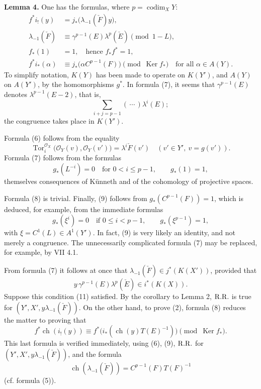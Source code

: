 \documentclass[11pt]{article}
\newcommand{\ch}{\operatorname{ch}}
\newcommand{\Tor}{\operatorname{Tor}}
\providecommand{\codim}{\operatorname{codim}}
\providecommand{\ch}{\operatorname{ch}}
\providecommand{\Tor}{\operatorname{Tor}}
\providecommand{\Ker}{\operatorname{Ker}}
\providecommand{\codim}{\operatorname{codim}}
\begin{document}
\textbf{Lemma 4.} One has the formulas, where \(p=\codim_XY\):
\begin{align}
  f^*i_!(y)&=j_*\bigl(\lambda_{-1}(\check F)y\bigr), \tag{6}\\
  \lambda_{-1}(\check F)&\equiv \gamma^{p-1}(E)\lambda^p(\check E)
    \pmod{1-L}, \tag{7}\\
  f_*(1)&=1,\quad\text{hence }f_*f^*=1, \tag{8}\\
  f^*i_*(\alpha)&\equiv j_*\bigl(\alpha C^{p-1}(F)\bigr)
    \pmod{\Ker f_*}\quad\text{for all }\alpha\in A(Y). \tag{9}
\end{align}
To simplify notation, \(K(Y)\) has been made to operate on \(K(Y')\), and \(A(Y)\) on \(A(Y')\), by the homomorphisms \(g^*\). In formula (7), it seems that \(\gamma^{p-1}(E)\) denotes \(\lambda^{p-1}(E-2)\), that is,
\[
  \sum_{i+j=p-1}(\,\cdots\,)\lambda^i(E);
\]
the congruence takes place in \(K(Y')\).

Formula (6) follows from the equality
\begin{equation}\tag{6 bis}
  \Tor_i^{\mathcal O_X}\bigl(\mathcal O_Y(v),\mathcal O_Y(v')\bigr)
  =
  \lambda^i\check F(v')
  \quad (v'\in Y',\ v=g(v')).
\end{equation}
Formula (7) follows from the formulas
\begin{equation}\tag{10}
  g_*(L^{-i})=0\quad\text{for }0<i\leq p-1,\qquad g_*(1)=1,
\end{equation}
themselves consequences of Künneth and of the cohomology of projective spaces.

Formula (8) is trivial. Finally, (9) follows from \(g_*(C^{p-1}(F))=1\), which is deduced, for example, from the immediate formulas
\begin{equation}\tag{10 bis}
  g_*(\xi^i)=0\quad\text{if }0\leq i<p-1,\qquad
  g_*(\xi^{p-1})=1,
\end{equation}
with \(\xi=C^1(L)\in A^1(Y')\). In fact, (9) is very likely an identity, and not merely a congruence. The unnecessarily complicated formula (7) may be replaced, for example, by VII 4.1.

From formula (7) it follows at once that \(\lambda_{-1}(\check F)\in j^*(K(X'))\), provided that
\begin{equation}\tag{11}
  y\,\gamma^{p-1}(E)\lambda^p(\check E)\in i^*(K(X)).
\end{equation}
Suppose this condition (11) satisfied. By the corollary to Lemma 2, \(\mathrm{R.R.}\) is true for \((Y',X',y\lambda_{-1}(\check F))\). On the other hand, to prove (2), formula (8) reduces the matter to proving that
\begin{equation}\tag{12}
  f^*\ch(i_!(y))
  \equiv
  f^*\bigl(i_*(\ch(y)T(E)^{-1})\bigr)
  \pmod{\Ker f_*}.
\end{equation}
This last formula is verified immediately, using (6), (9), \(\mathrm{R.R.}\) for \((Y',X',y\lambda_{-1}(\check F))\), and the formula
\begin{equation}\tag{13}
  \ch(\lambda_{-1}(\check F))=C^{p-1}(F)T(F)^{-1}
\end{equation}
(cf. formula (5)).
\end{document}
